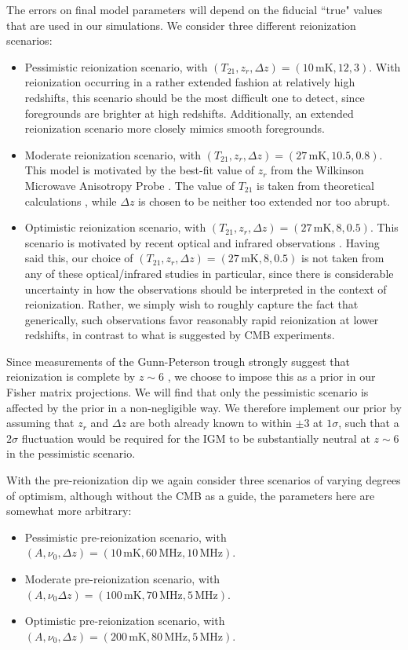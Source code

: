 \documentclass[twocolumn,apj,numberedappendix]{emulateapj}
\begin{document}
The errors on final model parameters will depend on the fiducial ``true" values that are used in our simulations. We consider three different reionization scenarios:
\begin{itemize}
\item Pessimistic reionization scenario, with $(T_{21}, z_r, \Delta z) = (10\,\textrm{mK}, 12, 3) $. With reionization occurring in a rather extended fashion at relatively high redshifts, this scenario should be the most difficult one to detect, since foregrounds are brighter at high redshifts. Additionally, an extended reionization scenario more closely mimics smooth foregrounds.
\item Moderate reionization scenario, with $(T_{21}, z_r, \Delta z) = (27\,\textrm{mK}, 10.5, 0.8) $. This model is motivated by the best-fit value of $z_r$ from the Wilkinson Microwave Anisotropy Probe \citep{WMAP9}. The value of $T_{21}$ is taken from theoretical calculations \citep{PritchardLoeb2010}, while $\Delta z$ is chosen to be neither too extended nor too abrupt.
\item Optimistic reionization scenario, with $(T_{21}, z_r, \Delta z) = (27\,\textrm{mK}, 8, 0.5) $. This scenario is motivated by recent optical and infrared observations \citep{fan_et_al2006,bolton_et_al2011,treu_et_al2013,Faisst_et_al2014}. Having said this, our choice of $(T_{21}, z_r, \Delta z) = (27\,\textrm{mK}, 8, 0.5)$ is not taken from any of these optical/infrared studies in particular, since there is considerable uncertainty in how the observations should be interpreted in the context of reionization. Rather, we simply wish to roughly capture the fact that generically, such observations favor reasonably rapid reionization at lower redshifts, in contrast to what is suggested by CMB experiments.
\end{itemize}
Since measurements of the Gunn-Peterson trough strongly suggest that reionization is complete by $z \sim 6$ \citep{fan_et_al2006}, we choose to impose this as a prior in our Fisher matrix projections. We will find that only the pessimistic scenario is affected by the prior in a non-negligible way. We therefore implement our prior by assuming that $z_r$ and $\Delta z$ are both already known to within $\pm 3$ at $1\sigma$, such that a $2\sigma$ fluctuation would be required for the IGM to be substantially neutral at $z \sim 6$ in the pessimistic scenario.

With the pre-reionization dip we again consider three scenarios of varying degrees of optimism, although without the CMB as a guide, the parameters here are somewhat more arbitrary:
\begin{itemize}
\item Pessimistic pre-reionization scenario, with $(A, \nu_0, \Delta z) = (10\,\textrm{mK}, 60\,\textrm{MHz}, 10\,\textrm{MHz}) $.
\item Moderate pre-reionization scenario, with $(A, \nu_0 \Delta z) = (100\,\textrm{mK}, 70\,\textrm{MHz}, 5\,\textrm{MHz}) $.
\item Optimistic pre-reionization scenario, with $(A, \nu_0, \Delta z) = (200\,\textrm{mK}, 80\,\textrm{MHz}, 5\,\textrm{MHz}) $.
\end{itemize}
\end{document}
